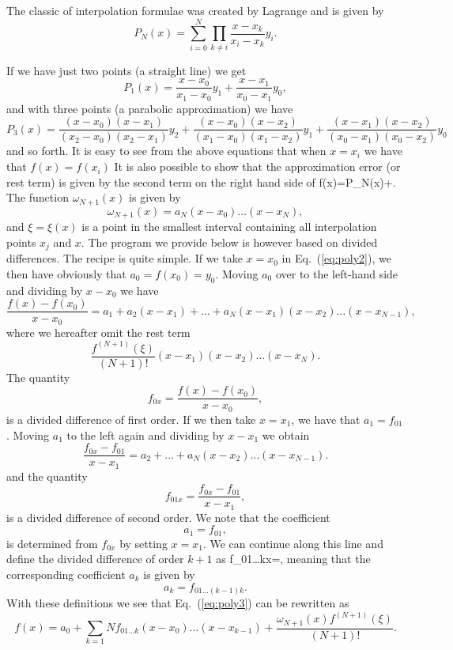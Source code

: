The classic of interpolation formulae was created by Lagrange and is given by
\begin{equation}
   P_N(x)=\sum_{i=0}^{N}\prod_{k\ne i} \frac{x-x_k}{x_i-x_k}y_i.
\label{eq:lagrange}
\end{equation}

If we have just two points (a straight line) we get
\[
   P_1(x)=\frac{x-x_0}{x_1-x_0}y_1+\frac{x-x_1}{x_0-x_1}y_0,
\]
and with three points (a parabolic approximation) we have
\[
     P_3(x)=\frac{(x-x_0)(x-x_1)}{(x_2-x_0)(x_2-x_1)}y_2+
            \frac{(x-x_0)(x-x_2)}{(x_1-x_0)(x_1-x_2)}y_1+
            \frac{(x-x_1)(x-x_2)}{(x_0-x_1)(x_0-x_2)}y_0
\]
and so forth. It is easy to see from the above equations that when
$x=x_i$ we have that $f(x)=f(x_i)$
It is also possible to show that the approximation error (or rest term) is given by
the second term on the right hand side of 
\be
    f(x)=P_N(x)+.
    \label{eq:poly3}
\ee
The function $\omega_{N+1}(x)$ is given by
\[
   \omega_{N+1}(x)=a_N(x-x_0)\dots(x-x_{N}),
\]
and $\xi=\xi(x)$ is a point in the smallest interval containing 
all interpolation points $x_j$ and $x$. 
The program we provide below 
is however based on divided differences. The recipe is quite simple. If we take
$x=x_0$ in Eq.\ (\ref{eq:poly2}), we then have obviously that 
$a_0=f(x_0)=y_0$. Moving $a_0$ over to the left-hand  side and dividing
by $x-x_0$ we have
\[
   \frac{f(x)-f(x_0)}{x-x_0}=a_1+a_2(x-x_1) + \dots+ a_N(x-x_1)(x-x_2)\dots(x-x_{N-1}),
\]
where we hereafter omit the rest term 
\[ 
   \frac{f^{(N+1)}(\xi)}{(N+1)!}(x-x_1)(x-x_2)\dots(x-x_{N}).
\]
The quantity
\[
   f_{0x}=\frac{f(x)-f(x_0)}{x-x_0},
\]
is a divided difference of first order. If we then take $x=x_1$, we have that
$a_1=f_{01}$. Moving $a_1$ to the left again and dividing by $x-x_1$ we obtain
\[ 
   \frac{f_{0x}-f_{01}}{x-x_1}=a_2 + \dots+ a_N(x-x_2)\dots(x-x_{N-1}).
\]
and the quantity 
\[
   f_{01x}=\frac{f_{0x}-f_{01}}{x-x_1},
\]
is a divided difference of second order. We note that the coefficient
\[ 
   a_1=f_{01},
\] 
is determined from $f_{0x}$ by setting $x=x_1$. We can continue along this line
and define the divided difference of order $k+1$ as 
\be
   f_{01\dots kx}=,
   \label{eq:divdiff}
\ee
meaning that the corresponding coefficient $a_k$ is given by
\[ 
   a_k=f_{01\dots(k-1)k}.
\]
With these definitions we see that Eq.\ (\ref{eq:poly3}) can be rewritten as
\[
        f(x)=a_0+\sum_{k=1}{N}f_{01\dots k}(x-x_0)\dots(x-x_{k-1})+\frac{\omega_{N+1}(x)f^{(N+1)}(\xi)}{(N+1)!}.   
\]
